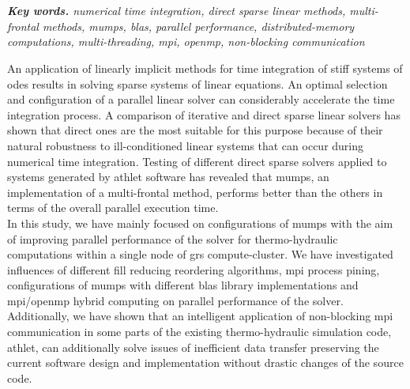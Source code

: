 \chapter{\abstractname}

\textit{\textbf{Key words.} numerical time integration, direct sparse linear methods, multi-frontal methods, \acrshort{mumps}, \acrshort{blas}, parallel performance, distributed-memory computations,  multi-threading, \acrshort{mpi}, \acrshort{openmp}, non-blocking communication}

\vspace{10mm}



An application of linearly implicit methods for time integration of stiff systems of \acrshort{ode}s  results in solving sparse systems of linear equations. An optimal selection and configuration of a parallel linear solver can considerably accelerate the time integration process. A comparison of iterative and direct sparse linear solvers has shown that direct ones are the most suitable for this purpose because of their natural robustness to ill-conditioned linear systems that can occur during numerical time integration. Testing of different direct sparse solvers applied to systems generated by \acrshort{athlet} software has revealed that \acrshort{mumps}, an implementation of a multi-frontal method, performs better than the others in terms of the overall parallel execution time.\\


In this study, we have mainly focused on configurations of \acrshort{mumps} with the aim of improving parallel performance of the solver for thermo-hydraulic computations within a single node of \acrshort{grs} compute-cluster. We have investigated influences of  different fill reducing reordering algorithms, \acrshort{mpi} process pining, configurations of \acrshort{mumps} with different \acrshort{blas} library implementations and \acrshort{mpi}/\acrshort{openmp} hybrid computing on parallel performance of the solver.\\


Additionally, we have shown that an intelligent application of non-blocking \acrshort{mpi} communication in some parts of the existing thermo-hydraulic simulation code, \acrshort{athlet}, can additionally solve issues of inefficient data transfer preserving the current software design and implementation without drastic changes of the source code.\\